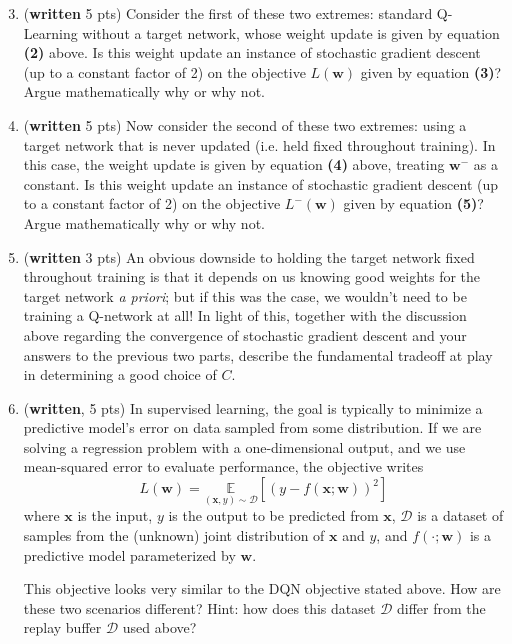 \documentclass{article}
\begin{document}
\begin{enumerate}
\setcounter{enumi}{2}
\item (\textbf{written} 5 pts) Consider the first of these two extremes: standard Q-Learning without a target network, whose weight update is given by equation \textbf{(2)} above. Is this weight update an instance of stochastic gradient descent (up to a constant factor of 2) on the objective $L(\mathbf{w})$ given by equation \textbf{(3)}? Argue mathematically why or why not.

\item (\textbf{written} 5 pts) Now consider the second of these two extremes: using a target network that is never updated (i.e. held fixed throughout training). In this case, the weight update is given by equation \textbf{(4)} above, treating $\mathbf{w^-}$ as a constant. Is this weight update an instance of stochastic gradient descent (up to a constant factor of 2) on the objective $L^{-}(\mathbf{w})$ given by equation \textbf{(5)}? Argue mathematically why or why not.

\item (\textbf{written} 3 pts) An obvious downside to holding the target network fixed throughout training is that it depends on us knowing good weights for the target network \textit{a priori}; but if this was the case, we wouldn't need to be training a Q-network at all! In light of this, together with the discussion above regarding the convergence of stochastic gradient descent and your answers to the previous two parts, describe the fundamental tradeoff at play in determining a good choice of $C$.

\item (\textbf{written}, 5 pts) In supervised learning, the goal is typically to minimize a predictive model's error on data sampled from some distribution.
If we are solving a regression problem with a one-dimensional output, and we use mean-squared error to evaluate performance, the objective writes
\[
L(\mathbf{w}) = \underset{(\mathbf{x},y) \sim \mathcal{D}}{\mathbb{E}}[(y - f(\mathbf{x}; \mathbf{w}))^2]
\]
where $\mathbf{x}$ is the input, $y$ is the output to be predicted from $\mathbf{x}$, $\mathcal{D}$ is a dataset of samples from the (unknown) joint distribution of $\mathbf{x}$ and $y$, and $f(\cdot; \mathbf{w})$ is a predictive model parameterized by $\mathbf{w}$.

This objective looks very similar to the DQN objective stated above.
How are these two scenarios different? Hint: how does this dataset $\mathcal{D}$ differ from the replay buffer $\mathcal{D}$ used above?
\end{enumerate}
\end{document}
